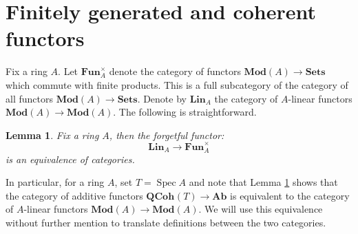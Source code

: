 \documentclass{amsart}
\theoremstyle{plain}
\newtheorem{lem}[thm]{Lemma}
\theoremstyle{definition}
\theoremstyle{remark}
\numberwithin{equation}{section}
\DeclareMathOperator{\spec}{Spec}
\newcommand{\QCOHB}{\mathbf{QCoh}}
\newcommand{\QCOH}[2][]{\QCOHB^{#1}({#2})}
\newcommand{\MOD}[1]{\mathbf{Mod}({#1})}
\newcommand{\AB}{\mathbf{Ab}}
\newcommand{\SETS}{\mathbf{Sets}}
\newcommand{\FUNP}[1]{\mathbf{Fun}_{{#1}}^{\times}}
\newcommand{\LIN}[1]{\mathbf{Lin}_{{#1}}}
\begin{document}
\section{Finitely generated and coherent functors}\label{sec:fg_coh}
Fix a ring $A$. Let $\FUNP{A}$ denote the category of functors 
$\MOD{A} \to \SETS$ which commute with finite products. This is a full
subcategory of the category of all functors $\MOD{A} \to \SETS$. Denote by
$\LIN{A}$ the category of $A$-linear functors $\MOD{A} 
\to\MOD{A}$. The following is straightforward. 
\begin{lem}\label{lem:runar}
  Fix a ring $A$, then the forgetful functor:
  \[
  \LIN{A} \to \FUNP{A}
  \]
 is an equivalence of categories. 
\end{lem}
In particular, for a ring $A$, set $T=\spec A$ and note that Lemma
\ref{lem:runar} shows that the category of additive functors
$\QCOH{T} \to \AB$ is equivalent to the 
category of $A$-linear functors $\MOD{A} \to \MOD{A}$. We will use
this equivalence without further mention to translate definitions
between the two categories. 
\end{document}
